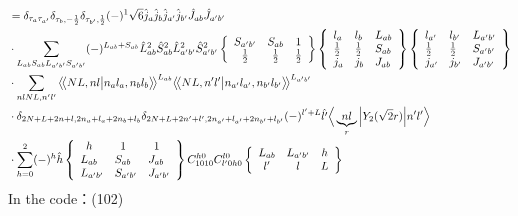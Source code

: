 \documentclass[master]{shnuthesis}
\newcommand{\llangle}{\big\langle\!\big\langle}
\newcommand{\rrangle}{\big\rangle\!\big\rangle}
\newcommand{\ap}{a^\prime}
\newcommand{\bp}{b^\prime}
\begin{document}
\begin{align}
    & = \delta_{\tau_a \tau_{\ap}}\delta_{\tau_b, -\frac{1}{2}}\delta_{\tau_{\bp}, \frac{1}{2}} (-)^{1} \sqrt{6}\hat{j}_a\hat{j}_b\hat{j}_{\ap}\hat{j}_{\bp} \hat{J}_{ab}\hat{J}_{\ap\bp}  \notag \\
    & \cdot \sum_{L_{ab}S_{ab}L_{\ap\bp}S_{\ap\bp}} (-)^{L_{ab}+S_{ab}} \hat{L}_{ab}^2\hat{S}_{ab}^2\hat{L}_{\ap\bp}^2\hat{S}_{\ap\bp}^2  \left\{\begin{array}{ccc} S_{\ap\bp} & S_{ab} & 1 \\ \frac{1}{2} & \frac{1}{2} & \frac{1}{2} \end{array}\right\}  \left\{\begin{array}{lll}l_{a} & l_{b} & L_{ab} \\ \frac{1}{2} & \frac{1}{2} & S_{ab} \\j_{a} & j_{b} & J_{ab} \end{array}\right\} \left\{\begin{array}{lll}l_{\ap} & l_{\bp} & L_{\ap\bp} \\ \frac{1}{2} & \frac{1}{2} & S_{\ap\bp} \\j_{\ap} & j_{\bp} & J_{\ap\bp} \end{array}\right\}  \notag\\
    & \cdot \sum_{nlNL,n^\prime l^\prime} \llangle N L, n l \big| n_{a} l_{a}, n_{b} l_{b} \rrangle^{L_{ab}} \llangle N L, n^\prime l^\prime \big| n_{a^\prime} l_{a^\prime}, n_{b^\prime} l_{b^\prime} \rrangle^{L_{\ap\bp}} \notag\\
    & \cdot \delta_{2N+L+2n+l,2n_a+l_a+2n_b+l_b}\delta_{2N+L+2n^\prime+l^\prime,2n_{a^\prime}+l_{a^\prime}+2n_{b^\prime}+l_{b^\prime}} (-)^{l^\prime+L}\hat{l^\prime} \Big\langle \underbrace{n l}_{r} \Big| Y_2(\sqrt{2}r) \Big| n^\prime l^\prime \Big\rangle  \notag\\
    & \cdot \sum_{h=0}^{2} (-)^{h}\hat{h} \left\{\begin{array}{lll} \,\,\,h & \,\,\,1 & \,\,\,1 \\ L_{ab} & S_{ab} & J_{ab} \\ L_{\ap\bp} & S_{\ap\bp} & J_{\ap\bp} \end{array}\right\}  C_{1010}^{h0}C_{l^\prime 0 h 0}^{l0}  \left\{\begin{array}{ccc} L_{ab} & L_{\ap\bp} & h \\ l^\prime & l & L \end{array}\right\}
\end{align}
In the code：(102)
\end{document}
